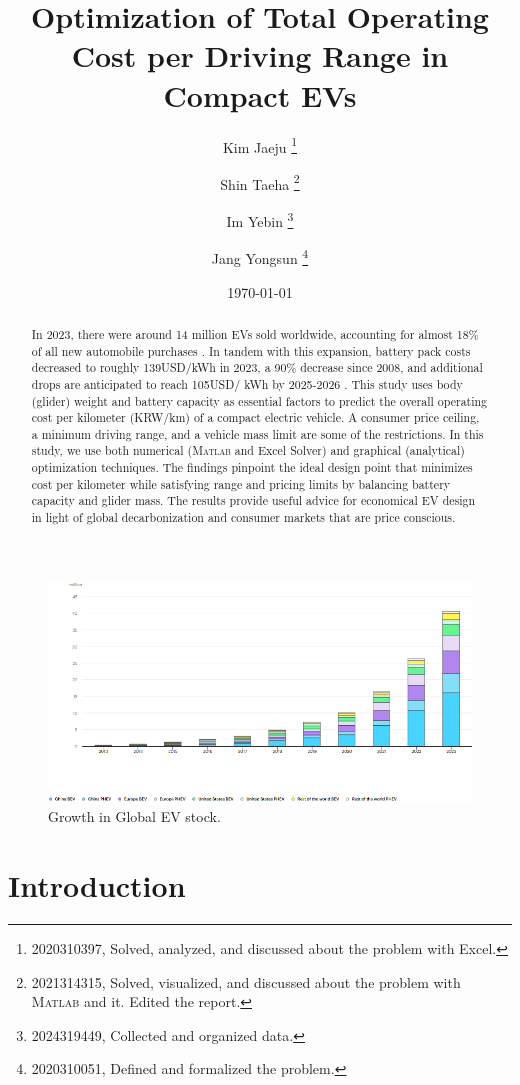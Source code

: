 \documentclass[11pt,twocolumn]{article}
\title{\textbf{Optimization of Total Operating Cost per Driving Range in Compact EVs}}
\author{Kim Jaeju \thanks{2020310397, Solved, analyzed, and discussed about the problem with Excel.} \and Shin Taeha \thanks{2021314315, Solved, visualized, and discussed about the problem with \textsc{Matlab} and it. Edited the report.} \and Im Yebin \thanks{2024319449, Collected and organized data.} \and Jang Yongsun \thanks{2020310051, Defined and formalized the problem.}}
\date{\today}
\begin{document}
    \begin{titlepage}
        \maketitle
        \begin{abstract}
            In 2023, there were around 14 million EVs sold worldwide, accounting for almost 18\% of all new automobile purchases \cite{iea24}.
            In tandem with this expansion, battery pack costs decreased to roughly 139USD/kWh in 2023, a 90\% decrease since 2008, and additional drops are anticipated to reach 105USD/ kWh by 2025-2026 \cite{iea24}\cite{doe23}.
            This study uses body (glider) weight and battery capacity as essential factors to predict the overall operating cost per kilometer (KRW/km) of a compact electric vehicle.
            A consumer price ceiling, a minimum driving range, and a vehicle mass limit are some of the restrictions.
            In this study, we use both numerical (\textsc{Matlab} and Excel Solver) and graphical (analytical) optimization techniques.
            The findings pinpoint the ideal design point that minimizes cost per kilometer while satisfying range and pricing limits by balancing battery capacity and glider mass.
            The results provide useful advice for economical EV design in light of global decarbonization and consumer markets that are price conscious.
        \end{abstract}
    \end{titlepage}
    \begin{figure}[h]
        \centering
        \includegraphics[width=0.8\columnwidth]{growth.png}
        \caption{Growth in Global EV stock.}
        \label{growth}
    \end{figure}
    \section{Introduction}
\end{document}
